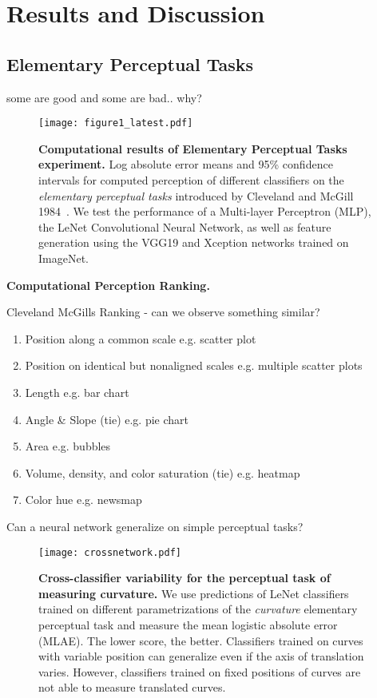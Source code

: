 \section{Results and Discussion}

\subsection{Elementary Perceptual Tasks}

some are good and some are bad.. why?

\begin{figure*}[h]
	  \texttt{[image: figure1\_latest.pdf]}
  \caption{\textbf{Computational results of Elementary Perceptual Tasks experiment.} Log absolute error means and 95\% confidence intervals for computed perception of different classifiers on the \emph{elementary perceptual tasks} introduced by Cleveland and McGill 1984~\cite{cleveland_mcgill}. We test the performance of a Multi-layer Perceptron (MLP), the LeNet Convolutional Neural Network, as well as feature generation using the VGG19 and Xception networks trained on ImageNet.}
	\label{fig:figure1_results}
\end{figure*}

\textbf{Computational Perception Ranking.}

Cleveland McGills Ranking - can we observe something similar?

\begin{enumerate}
	\item Position along a common scale e.g. scatter plot
	\item Position on identical but nonaligned scales e.g. multiple scatter plots
	\item Length e.g. bar chart
	\item Angle \& Slope (tie) e.g. pie chart
	\item Area e.g. bubbles
	\item Volume, density, and color saturation (tie) e.g. heatmap
	\item Color hue e.g. newsmap
\end{enumerate}


Can a neural network generalize on simple perceptual tasks?

\begin{figure}[t]
	  \texttt{[image: crossnetwork.pdf]}
  \caption{\textbf{Cross-classifier variability for the perceptual task of measuring curvature.} We use predictions of LeNet classifiers trained on different parametrizations of the \emph{curvature} elementary perceptual task and measure the mean logistic absolute error (MLAE). The lower score, the better. Classifiers trained on curves with variable position can generalize even if the axis of translation varies. However, classifiers trained on fixed positions of curves are not able to measure translated curves.}
	\label{fig:cross_network}
\end{figure}


